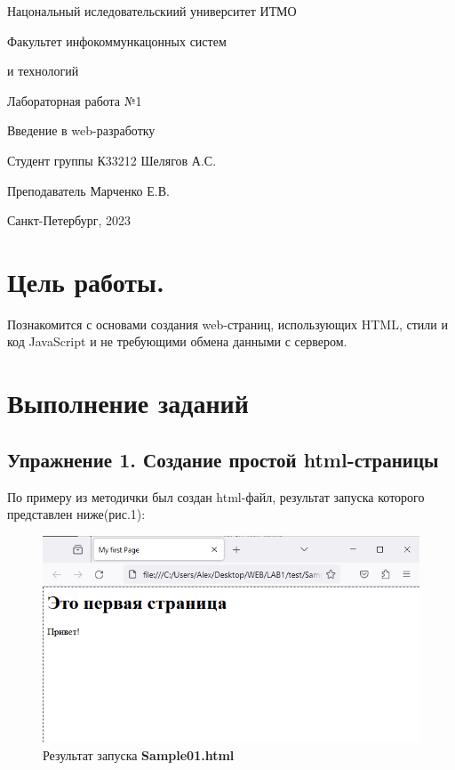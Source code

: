 \documentclass[a4paper,12pt]{article}
\begin{document}
\begin{titlepage}

\thispagestyle{empty}
\centerline{\Large{Нацональный иследовательскиий университет ИТМО}}
\centerline{\Large{Факультет инфокоммункацонных систем}}
\centerline{\Large{и технологий}}

\vfill

\centerline{\huge{Лабораторная работа №1}}
\vspace{0.5cm}
\centerline{\Large{Введение в web-разработку}}

\vfill

Студент группы К33212 \hfill Шелягов А.С.

Преподаватель \hfill Марченко Е.В.

\vfill

\centerline{Санкт-Петербург, 2023}
\clearpage
\end{titlepage}


\section{Цель работы.}

Познакомится с основами создания web-страниц, использующих
HTML, стили и код JavaScript и не требующими обмена данными с сервером.


\section{Выполнение заданий}

\subsection{Упражнение 1.  Создание простой html-страницы}
По примеру из методички был создан html-файл, результат запуска которого представлен ниже(рис.1):
\begin{figure}[!h]
\begin{center}
\includegraphics[scale=0.7]{pic1.png}
\caption{Результат запуска \textbf{Sample01.html}}
\end{center}
\end{figure}
\end{document}
